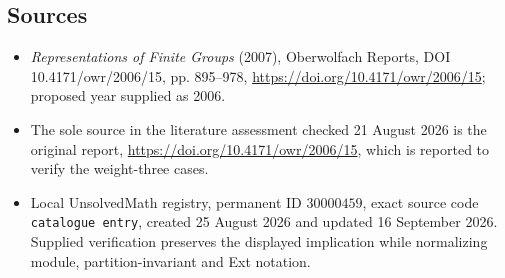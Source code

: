 \documentclass[11pt]{article}
\begin{document}
\subsection{Sources}
\begin{itemize}
\item \emph{Representations of Finite Groups} (2007), Oberwolfach Reports, DOI 10.4171/owr/2006/15, pp. 895--978, \url{https://doi.org/10.4171/owr/2006/15}; proposed year supplied as 2006.
\item The sole source in the literature assessment checked 21 August 2026 is the original report, \url{https://doi.org/10.4171/owr/2006/15}, which is reported to verify the weight-three cases.
\item Local UnsolvedMath registry, permanent ID $30000459$, exact source code \texttt{catalogue entry}, created 25 August 2026 and updated 16 September 2026. Supplied verification preserves the displayed implication while normalizing module, partition-invariant and Ext notation.
\end{itemize}
\end{document}
